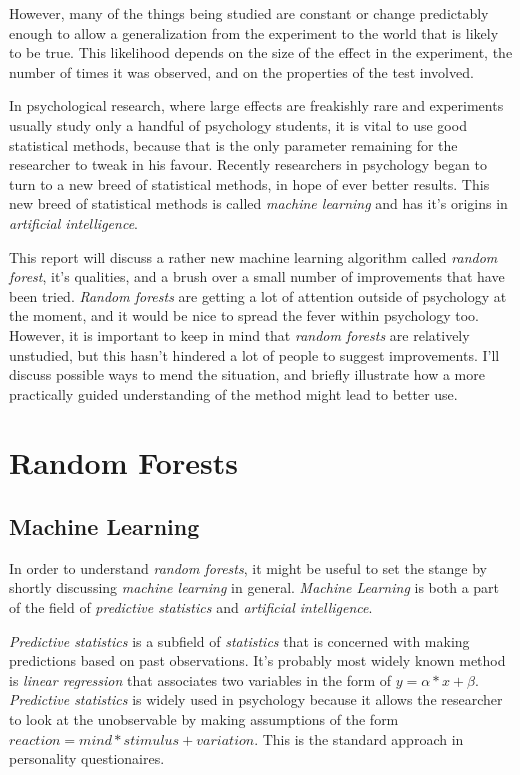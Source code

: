 \documentclass[a4paper,man,12pt,apacite]{apa6} %
\begin{document}
However, many of the things being studied are constant or change
predictably enough to allow a generalization from the experiment to the world
that is likely to be true. This likelihood depends on the size of the
effect in the experiment, the number of times it was observed, and on
the properties of the test involved.

In psychological research, where large effects are freakishly rare and
experiments usually study only a handful of psychology students, it is
vital to use good statistical methods, because that is the only parameter
remaining for the researcher to tweak in his favour.
Recently researchers in psychology began to turn to a new breed of
statistical methods, in hope of ever better results. This new breed of
statistical methods is called \emph{machine learning} and has it's origins in
\emph{artificial intelligence}.

This report will discuss a rather new machine learning algorithm called
\emph{random forest}, it's qualities, and a brush over a small number of
improvements that have been tried.
\emph{Random forests} are getting a lot of attention outside of psychology
at the moment, and it would be nice to spread the fever within psychology too.
However, it is important to keep in mind that \emph{random forests} are
relatively unstudied, but this hasn't hindered a lot of people to suggest
improvements. I'll discuss possible ways to mend the situation, and briefly
illustrate how a more practically guided understanding of the method might
lead to better use.

\section{Random Forests}

\subsection{Machine Learning}
In order to understand \emph{random forests}, it might be useful to set
the stange by shortly discussing \emph{machine learning} in general.
\emph{Machine Learning} is both a part of the field of
\emph{predictive statistics} and \emph{artificial intelligence}.

\emph{Predictive statistics} is a subfield of \emph{statistics} that is
concerned with making predictions based on past observations.
It's probably most widely known method is \emph{linear regression} that
associates two variables in the form of \(y = \alpha * x + \beta \).
\emph{Predictive statistics} is widely used in psychology because it
allows the researcher to look at the unobservable by making
assumptions of the form \(reaction = mind * stimulus + variation\).
This is the standard approach in personality questionaires.
\end{document}
